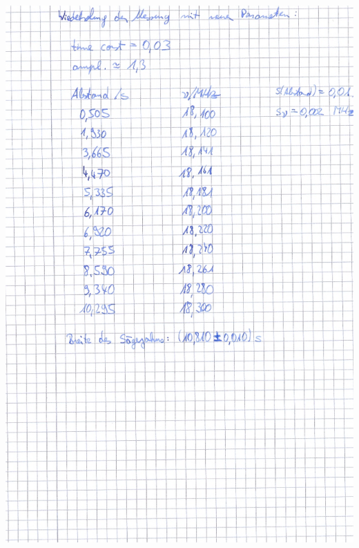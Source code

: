 \begin{appendix}
\centering \includegraphics[width = \textwidth]{appendix/scan0005.jpg}




 
\end{appendix}
